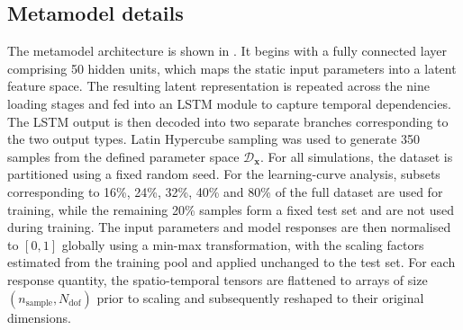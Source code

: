 \subsection{Metamodel details}\noindent
The metamodel architecture is shown in . It begins with a fully connected layer comprising 50 hidden units, which maps the static input parameters into a latent feature space. The resulting latent representation is repeated across the nine loading stages and fed into an LSTM module to capture temporal dependencies. The LSTM output is then decoded into two separate branches corresponding to the two output types. Latin Hypercube sampling was used to generate 350 samples from the defined parameter space $\mathcal{D}_{\boldsymbol{x}}$. For all simulations, the dataset is partitioned using a fixed random seed. For the learning-curve analysis, subsets corresponding to 16\%, 24\%, 32\%, 40\% and 80\% of the full dataset are used for training, while the remaining 20\% samples form a fixed test set and are not used during training. The input parameters and model responses are then normalised to $[0,1]$ globally using a min-max transformation, with the scaling factors estimated from the training pool and applied unchanged to the test set. For each response quantity, the spatio-temporal tensors are flattened to arrays of size $(n_{\text{sample}}, N_{\text{dof}})$ prior to scaling and subsequently reshaped to their original dimensions.



